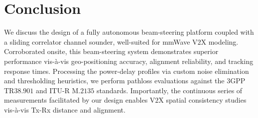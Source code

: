 \documentclass[10pt, twocolumn]{IEEEtran}
\begin{document}
\balance
\section{Conclusion}\label{S5}
We discuss the design of a fully autonomous beam-steering platform coupled with a sliding correlator channel sounder, well-suited for mmWave V$2$X modeling. Corroborated onsite, this beam-steering system demonstrates superior performance vis-\`{a}-vis geo-positioning accuracy, alignment reliability, and tracking response times. Processing the power-delay profiles via custom noise elimination and thresholding heuristics, we perform pathloss evaluations against the $3$GPP TR$38.901$ and ITU-R M$.2135$ standards. Importantly, the continuous series of measurements facilitated by our design enables V$2$X spatial consistency studies vis-\`{a}-vis Tx-Rx distance and alignment.

\balance

 
\end{document}
